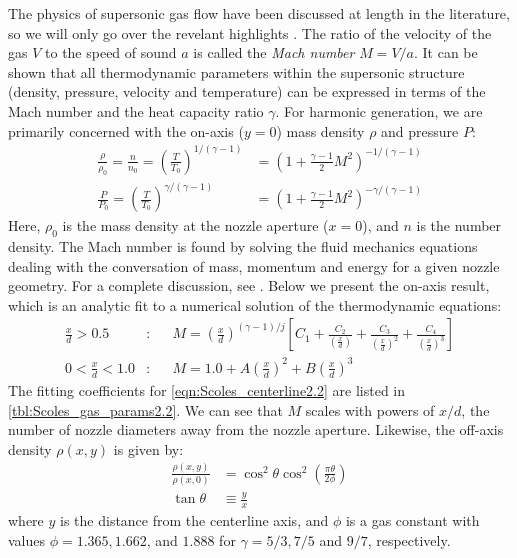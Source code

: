 The physics of supersonic gas flow have been discussed at length in the literature, so we will only go over the revelant highlights \cite{millerFreeJetSources1988}. The ratio of the velocity of the gas $V$ to the speed of sound $a$ is called the \textit{Mach number} $M=V/a$. It can be shown that all thermodynamic parameters within the supersonic structure (density, pressure, velocity and temperature) can be expressed in terms of the Mach number and the heat capacity ratio $\gamma$. For harmonic generation, we are primarily concerned with the on-axis ($y=0$) mass density $\rho$ and pressure $P$:
\begin{align}
\frac{\rho}{\rho_0} = \frac{n}{n_0} = \left(\frac{T}{T_0}\right)^{1/(\gamma-1)} &= \left(  1 + \frac{\gamma-1}{2} M^2 \right)^{-1/(\gamma-1)} \\
\frac{P}{P_0} = \left(\frac{T}{T_0}\right)^{\gamma/(\gamma-1)} &= \left(  1 + \frac{\gamma-1}{2} M^2 \right)^{-\gamma/(\gamma-1)}
\label{eqn:mach_properties}
\end{align}
Here, $\rho_0$ is the mass density at the nozzle aperture ($x=0$), and $n$ is the number density. The Mach number is found by solving the fluid mechanics equations dealing with the conversation of mass, momentum and energy for a given nozzle geometry. For a complete discussion, see \cite{millerFreeJetSources1988}. Below we present the on-axis result, which is an analytic fit to a numerical solution of the thermodynamic equations:
\begin{subequations}
	\label{eqn:Scoles_centerline2.2}
	\begin{align}
	\frac{x}{d} > 0.5&: &&M = \left( \frac{x}{d} \right)^{(\gamma-1)/j} \left[ C_1 + \frac{C_2}{\left(\frac{x}{d}\right)} + \frac{C_3}{\left(\frac{x}{d}\right)^2} + \frac{C_4}{\left(\frac{x}{d}\right)^3} \right] \label{eqn:Scoles_centerline1} \\
	0 < \frac{x}{d} < 1.0&: &&M = 1.0 + A \left( \frac{x}{d} \right)^2 + B \left( \frac{x}{d} \right)^3 \label{eqn:Scoles_centerline2}
	\end{align}
\end{subequations}
The fitting coefficients for \cref{eqn:Scoles_centerline2.2} are listed in \cref{tbl:Scoles_gas_params2.2}. We can see that $M$ scales with powers of $x/d$, the number of nozzle diameters away from the nozzle aperture. Likewise, the off-axis density $\rho(x,y)$ is given by:
\begin{align}
\frac{\rho(x,y)}{\rho(x,0)} &= \cos^2 \theta \cos^2 \left( \frac{\pi \theta}{2 \phi} \right) \\
\tan \theta &\equiv \frac{y}{x}
\label{eqn:off-axis-density}
\end{align}
where $y$ is the distance from the centerline axis, and $\phi$ is a gas constant with values $\phi = 1.365, 1.662$, and $1.888$ for $\gamma = 5/3, 7/5$ and $9/7$, respectively.

